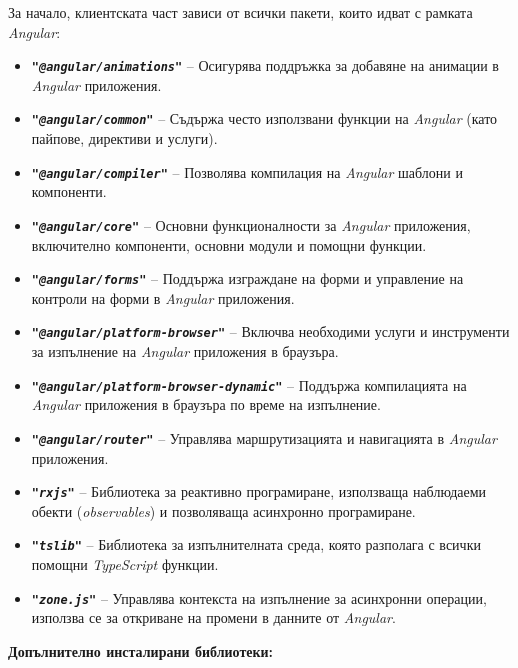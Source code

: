 \vspace{-0.4cm}

За начало, клиентската част зависи от всички пакети, които идват с рамката \textit{Angular}:

\vspace{-0.4cm}

\begin{itemize}
	\item \texttt{\textbf{"\textit{@angular/animations}"}} -- Осигурява поддръжка за добавяне на анимации в \textit{Angular} приложения.
	\item \texttt{\textbf{"\textit{@angular/common}"}} -- Съдържа често използвани функции на \textit{Angular} (като пайпове, директиви и услуги).
	\item \texttt{\textbf{"\textit{@angular/compiler}"}} -- Позволява компилация на \textit{Angular} шаблони и компоненти.
	\item \texttt{\textbf{"\textit{@angular/core}"}} -- Основни функционалности за \textit{Angular} приложения, включително компоненти, основни модули и помощни функции.
	\item \texttt{\textbf{"\textit{@angular/forms}"}} -- Поддържа изграждане на форми и управление на контроли на форми в \textit{Angular} приложения.
	\item \texttt{\textbf{"\textit{@angular/platform-browser}"}} -- Включва необходими услуги и инструменти за изпълнение на \textit{Angular} приложения в браузъра.
	\item \texttt{\textbf{"\textit{@angular/platform-browser-dynamic}"}} -- Поддържа компилацията на \textit{Angular} приложения в браузъра по време на изпълнение.
	\item \texttt{\textbf{"\textit{@angular/router}"}} -- Управлява маршрутизацията и навигацията в \textit{Angular} приложения. 
	\item \texttt{\textbf{"\textit{rxjs}"}} -- Библиотека за реактивно програмиране, използваща наблюдаеми обекти (\textit{observables}) и позволяваща асинхронно програмиране.
	\item \texttt{\textbf{"\textit{tslib}"}} -- Библиотека за изпълнителната среда, която разполага с всички помощни \textit{TypeScript} функции.
	\item \texttt{\textbf{"\textit{zone.js}"}} -- Управлява контекста на изпълнение за асинхронни операции, използва се за откриване на промени в данните от \textit{Angular}.
\end{itemize}


\textbf{Допълнително инсталирани библиотеки:}

